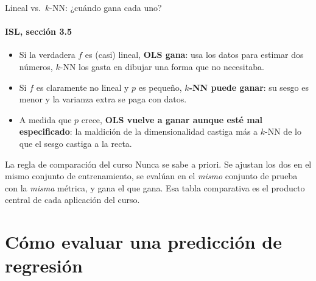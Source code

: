 \documentclass{beamer}
\newcommand{\1}{\mathbb{I}}
\begin{document}
\begin{frame}{Lineal vs.\ $k$-NN: ¿cuándo gana cada uno?}
\framesubtitle{ISL, sección 3.5}
\small
\begin{itemize}\itemsep5pt
  \item Si la verdadera $f$ es (casi) lineal, \textbf{OLS gana}: usa los datos para estimar dos números, $k$-NN los gasta en dibujar una forma que no necesitaba. \pause
  \item Si $f$ es claramente no lineal y $p$ es pequeño, \textbf{$k$-NN puede ganar}: su sesgo es menor y la varianza extra se paga con datos. \pause
  \item A medida que $p$ crece, \textbf{OLS vuelve a ganar aunque esté mal especificado}: la maldición de la dimensionalidad castiga más a $k$-NN de lo que el sesgo castiga a la recta. \pause
\end{itemize}
\vspace{0.1cm}
\begin{block}{La regla de comparación del curso}
Nunca se sabe a priori. Se ajustan los dos en el mismo conjunto de entrenamiento, se evalúan en el \emph{mismo} conjunto de prueba con la \emph{misma} métrica, y gana el que gana. Esa tabla comparativa es el producto central de cada aplicación del curso.
\end{block}
\end{frame}


\section{Cómo evaluar una predicción de regresión}
\begin{frame}[noframenumbering]
\tableofcontents[currentsection]
\end{frame}
\end{document}
